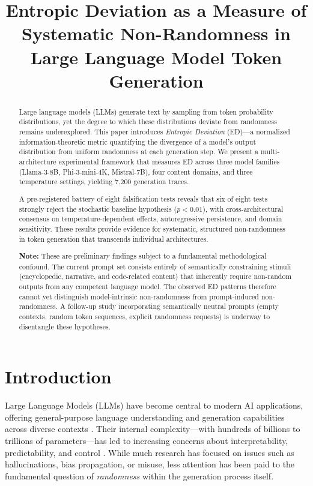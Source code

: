 \documentclass[12pt]{article}
\title{\textbf{Entropic Deviation as a Measure of Systematic Non-Randomness in Large Language Model Token Generation}}
\date{}
\begin{document}
\maketitle

\begin{abstract}
Large language models (LLMs) generate text by sampling from token probability distributions, yet the degree to which these distributions deviate from randomness remains underexplored. This paper introduces \emph{Entropic Deviation} (ED)---a normalized information-theoretic metric quantifying the divergence of a model's output distribution from uniform randomness at each generation step. We present a multi-architecture experimental framework that measures ED across three model families (Llama-3-8B, Phi-3-mini-4K, Mistral-7B), four content domains, and three temperature settings, yielding 7{,}200 generation traces.

A pre-registered battery of eight falsification tests reveals that six of eight tests strongly reject the stochastic baseline hypothesis ($p < 0.01$), with cross-architectural consensus on temperature-dependent effects, autoregressive persistence, and domain sensitivity. These results provide evidence for systematic, structured non-randomness in token generation that transcends individual architectures.

\textbf{Note:} These are preliminary findings subject to a fundamental methodological confound. The current prompt set consists entirely of semantically constraining stimuli (encyclopedic, narrative, and code-related content) that inherently require non-random outputs from any competent language model. The observed ED patterns therefore cannot yet distinguish model-intrinsic non-randomness from prompt-induced non-randomness. A follow-up study incorporating semantically neutral prompts (empty contexts, random token sequences, explicit randomness requests) is underway to disentangle these hypotheses.
\end{abstract}

\section{Introduction}

Large Language Models (LLMs) have become central to modern AI applications, offering general-purpose language understanding and generation capabilities across diverse contexts \citep{brown2020language, bommasani2021opportunities}. Their internal complexity---with hundreds of billions to trillions of parameters---has led to increasing concerns about interpretability, predictability, and control \citep{bubeck2023sparks}. While much research has focused on issues such as hallucinations, bias propagation, or misuse, less attention has been paid to the fundamental question of \emph{randomness} within the generation process itself.
\end{document}
